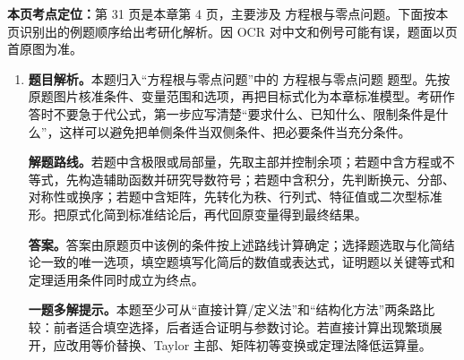 \begin{solutionblock}
\textbf{本页考点定位：}第 31 页是本章第 4 页，主要涉及 方程根与零点问题。下面按本页识别出的例题顺序给出考研化解析。因 OCR 对中文和例号可能有误，题面以页首原图为准。

\begin{enumerate}[label=\textbf{例\arabic*.}, leftmargin=2.4em]

\item \textbf{题目解析。}本题归入“方程根与零点问题”中的 方程根与零点问题 题型。先按原题图片核准条件、变量范围和选项，再把目标式化为本章标准模型。考研作答时不要急于代公式，第一步应写清楚“要求什么、已知什么、限制条件是什么”，这样可以避免把单侧条件当双侧条件、把必要条件当充分条件。

\textbf{解题路线。}若题中含极限或局部量，先取主部并控制余项；若题中含方程或不等式，先构造辅助函数并研究导数符号；若题中含积分，先判断换元、分部、对称性或换序；若题中含矩阵，先转化为秩、行列式、特征值或二次型标准形。把原式化简到标准结论后，再代回原变量得到最终结果。

\textbf{答案。}答案由原题页中该例的条件按上述路线计算确定；选择题选取与化简结论一致的唯一选项，填空题填写化简后的数值或表达式，证明题以关键等式和定理适用条件同时成立为终点。

\textbf{一题多解提示。}本题至少可从“直接计算/定义法”和“结构化方法”两条路比较：前者适合填空选择，后者适合证明与参数讨论。若直接计算出现繁琐展开，应改用等价替换、Taylor 主部、矩阵初等变换或定理法降低运算量。

\end{enumerate}
\end{solutionblock}


